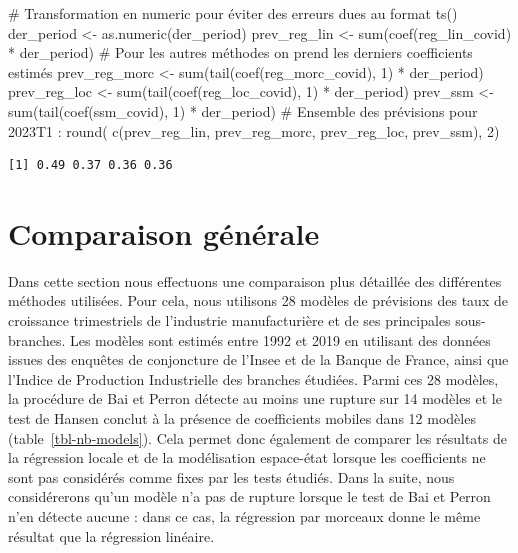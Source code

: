\documentclass[
  a4paper,
  DIV=11,
  numbers=noendperiod,
  french]{scrartcl}
\newenvironment{Shaded}{\begin{snugshade}}{\end{snugshade}}
\newcommand{\CommentTok}[1]{\textcolor[rgb]{0.37,0.37,0.37}{#1}}
\newcommand{\DecValTok}[1]{\textcolor[rgb]{0.68,0.00,0.00}{#1}}
\newcommand{\FunctionTok}[1]{\textcolor[rgb]{0.28,0.35,0.67}{#1}}
\newcommand{\NormalTok}[1]{\textcolor[rgb]{0.00,0.23,0.31}{#1}}
\newcommand{\OtherTok}[1]{\textcolor[rgb]{0.00,0.23,0.31}{#1}}
\newcommand{\SpecialCharTok}[1]{\textcolor[rgb]{0.37,0.37,0.37}{#1}}
\newcommand\1{{\mathds 1}}
\theoremstyle{remark}
\begin{document}
\begin{Shaded}
\begin{Highlighting}[]
\CommentTok{\# Transformation en numeric pour éviter des erreurs dues au format ts()}
\NormalTok{der\_period }\OtherTok{\textless{}{-}} \FunctionTok{as.numeric}\NormalTok{(der\_period)}
\NormalTok{prev\_reg\_lin }\OtherTok{\textless{}{-}} \FunctionTok{sum}\NormalTok{(}\FunctionTok{coef}\NormalTok{(reg\_lin\_covid) }\SpecialCharTok{*}\NormalTok{ der\_period)}
\CommentTok{\# Pour les autres méthodes on prend les derniers coefficients estimés}
\NormalTok{prev\_reg\_morc }\OtherTok{\textless{}{-}} \FunctionTok{sum}\NormalTok{(}\FunctionTok{tail}\NormalTok{(}\FunctionTok{coef}\NormalTok{(reg\_morc\_covid), }\DecValTok{1}\NormalTok{) }\SpecialCharTok{*}\NormalTok{ der\_period)}
\NormalTok{prev\_reg\_loc }\OtherTok{\textless{}{-}} \FunctionTok{sum}\NormalTok{(}\FunctionTok{tail}\NormalTok{(}\FunctionTok{coef}\NormalTok{(reg\_loc\_covid), }\DecValTok{1}\NormalTok{) }\SpecialCharTok{*}\NormalTok{ der\_period)}
\NormalTok{prev\_ssm }\OtherTok{\textless{}{-}} \FunctionTok{sum}\NormalTok{(}\FunctionTok{tail}\NormalTok{(}\FunctionTok{coef}\NormalTok{(ssm\_covid), }\DecValTok{1}\NormalTok{) }\SpecialCharTok{*}\NormalTok{ der\_period)}
\CommentTok{\# Ensemble des prévisions pour 2023T1 :}
\FunctionTok{round}\NormalTok{(}
  \FunctionTok{c}\NormalTok{(prev\_reg\_lin, prev\_reg\_morc, prev\_reg\_loc, prev\_ssm), }
  \DecValTok{2}\NormalTok{)}
\end{Highlighting}
\end{Shaded}

\begin{verbatim}
[1] 0.49 0.37 0.36 0.36
\end{verbatim}

\section{Comparaison générale}\label{sec-comp-generales}

Dans cette section nous effectuons une comparaison plus détaillée des
différentes méthodes utilisées. Pour cela, nous utilisons 28 modèles de
prévisions des taux de croissance trimestriels de l'industrie
manufacturière et de ses principales sous-branches. Les modèles sont
estimés entre 1992 et 2019 en utilisant des données issues des enquêtes
de conjoncture de l'Insee et de la Banque de France, ainsi que l'Indice
de Production Industrielle des branches étudiées. Parmi ces 28 modèles,
la procédure de Bai et Perron détecte au moins une rupture sur 14
modèles et le test de Hansen conclut à la présence de coefficients
mobiles dans 12 modèles (table~\ref{tbl-nb-models}). Cela permet donc
également de comparer les résultats de la régression locale et de la
modélisation espace-état lorsque les coefficients ne sont pas considérés
comme fixes par les tests étudiés. Dans la suite, nous considérerons
qu'un modèle n'a pas de rupture lorsque le test de Bai et Perron n'en
détecte aucune : dans ce cas, la régression par morceaux donne le même
résultat que la régression linéaire.
\end{document}
